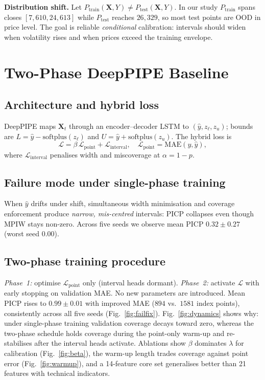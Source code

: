 \documentclass[conference]{IEEEtran}
\begin{document}
\textbf{Distribution shift.} Let
$P_{\mathrm{train}}(\mathbf{X},Y)\neq P_{\mathrm{test}}(\mathbf{X},Y)$. In our study
$P_{\mathrm{train}}$ spans closes $[7{,}610,24{,}613]$ while $P_{\mathrm{test}}$ reaches
$26{,}329$, so most test points are OOD in price level. The goal is reliable \emph{conditional}
calibration: intervals should widen when volatility rises and when prices exceed the training
envelope.

\section{Two-Phase DeepPIPE Baseline}
\label{sec:twophase}
\subsection{Architecture and hybrid loss}
DeepPIPE maps $\mathbf{X}_t$ through an encoder--decoder LSTM to $(\hat{y},z_\ell,z_u)$; bounds
are $L=\hat{y}-\mathrm{softplus}(z_\ell)$ and $U=\hat{y}+\mathrm{softplus}(z_u)$. The hybrid loss
is
\begin{equation}
  \mathcal{L}=\beta\,\mathcal{L}_{\mathrm{point}}+\mathcal{L}_{\mathrm{interval}},\quad
  \mathcal{L}_{\mathrm{point}}=\mathrm{MAE}(y,\hat{y}),
\end{equation}
where $\mathcal{L}_{\mathrm{interval}}$ penalises width and miscoverage at $\alpha=1-p$.

\subsection{Failure mode under single-phase training}
When $\hat{y}$ drifts under shift, simultaneous width minimisation and coverage enforcement
produce \emph{narrow, mis-centred} intervals: PICP collapses even though MPIW stays non-zero.
Across five seeds we observe mean PICP $0.32\pm0.27$ (worst seed $0.00$).

\subsection{Two-phase training procedure}
\emph{Phase~1:} optimise $\mathcal{L}_{\mathrm{point}}$ only (interval heads dormant).
\emph{Phase~2:} activate $\mathcal{L}$ with early stopping on validation MAE. No new parameters
are introduced. Mean PICP rises to $0.99\pm0.01$ with improved MAE ($894$ vs.\ $1581$ index
points), consistently across all five seeds (Fig.~\ref{fig:failfix}). Fig.~\ref{fig:dynamics}
shows why: under single-phase training validation coverage decays toward zero, whereas the
two-phase schedule holds coverage during the point-only warm-up and re-stabilises after the
interval heads activate. Ablations show $\beta$ dominates $\lambda$ for calibration
(Fig.~\ref{fig:beta}), the warm-up length trades coverage against point error
(Fig.~\ref{fig:warmup}), and a 14-feature core set generalises better than 21 features with
technical indicators.
\end{document}
